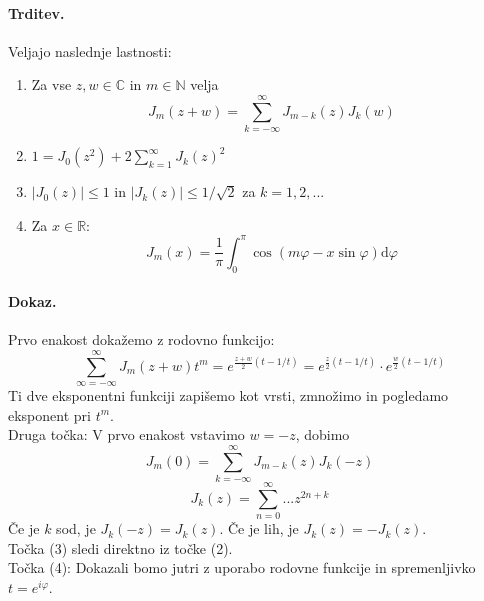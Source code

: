 \documentclass[a4paper]{article}
\newcommand{\dif}{\mathrm{d}}
\newcommand{\C}{\mathbb{C}}
\newcommand{\R}{\mathbb{R}}
\newcommand{\N}{\mathbb{N}}
\newcommand{\Sum}[2][0]{\sum_{{#2} = {#1}}^{\infty}}
\begin{document}
\paragraph{Trditev.} Veljajo naslednje lastnosti:
\begin{enumerate}
    \item Za vse $z, w \in \C$ in $m \in \N$ velja $$J_m(z+w) = \Sum[-\infty]{k}J_{m-k}(z)J_k(w)$$
    \item $\displaystyle{1 = J_0(z^2) + 2\Sum[1]{k}J_k(z)^2}$
    \item $|J_0(z)| \leq 1$ in $|J_k(z)|\leq 1/\sqrt{2}$ za $k = 1, 2, ...$
    \item Za $x \in \R$: $$J_m(x) = \frac{1}{\pi} \int_{0}^{\pi} \cos(m\varphi - x\sin\varphi)\dif\varphi$$
\end{enumerate}
\paragraph{Dokaz.} Prvo enakost dokažemo z rodovno funkcijo:
$$\Sum[-\infty]{\infty} J_m(z+w) t^m = e^{\frac{z+w}{2}(t - 1/t)} = e^{\frac{z}{2}(t-1/t)} \cdot e^{\frac{w}{2}(t-1/t)}$$
Ti dve eksponentni funkciji zapišemo kot vrsti, zmnožimo in pogledamo eksponent pri $t^m$. \\[2mm]
Druga točka: V prvo enakost vstavimo $w = -z$, dobimo $$J_m(0) = \Sum[-\infty]{k}J_{m-k} (z)J_k(-z)$$
$$J_k(z) = \Sum{n} ... z^{2n+k}$$
Če je $k$ sod, je $J_k(-z) = J_k(z)$. Če je lih, je $J_k(z) = -J_k(z)$. \\[2mm]
Točka (3) sledi direktno iz točke (2). \\[2mm]
Točka (4): Dokazali bomo jutri z uporabo rodovne funkcije in spremenljivko $t = e^{i\varphi}$.
\end{document}
